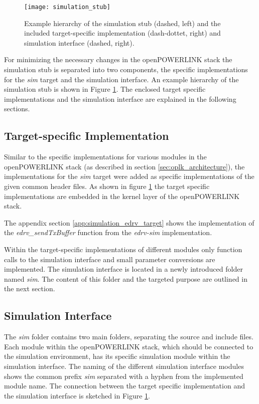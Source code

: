 \begin{figure}
    \centering
    \texttt{[image: simulation\_stub]}
    \caption{Example hierarchy of the simulation stub (dashed, left) and the included target-specific implementation (dash-dottet, right) and simulation interface (dashed, right).}
    \label{fig:simulation_stub}
\end{figure}

For minimizing the necessary changes in the openPOWERLINK stack the simulation stub is separated into two components, the specific implementations for the \emph{sim} target and the simulation interface.
An example hierarchy of the simulation stub is shown in Figure \ref{fig:simulation_stub}.
The enclosed target specific implementations and the simulation interface are explained in the following sections.

\subsection{Target-specific Implementation}
\label{sec:porting_simstub_target}
\begin{sloppypar}
Similar to the specific implementations for various modules in the openPOWERLINK stack (as described in section \ref{sec:oplk_architecture}), the implementations for the \emph{sim} target were added as specific implementations of the given common header files.
As shown in figure \ref{fig:simulation_stub} the target specific implementations are embedded in the kernel layer of the openPOWERLINK stack.
\end{sloppypar}

\begin{sloppypar}
The appendix section \ref{app:simulation_edrv_target} shows the implementation of the \emph{edrv\_sendTxBuffer} function from the \emph{edrv-sim} implementation.
\end{sloppypar}

Within the target-specific implementations of different modules only function calls to the simulation interface and small parameter conversions are implemented.
The simulation interface is located in a newly introduced folder named \emph{sim}.
The content of this folder and the targeted purpose are outlined in the next section.

\subsection{Simulation Interface}
\label{sec:porting_simstub_siminterface}
The \emph{sim} folder contains two main folders, separating the source and include files.
Each module within the openPOWERLINK stack, which should be connected to the simulation environment, has its specific simulation module within the simulation interface.
The naming of the different simulation interface modules shows the common prefix \emph{sim} separated with a hyphen from the implemented module name.
The connection between the target specific implementation and the simulation interface is sketched in Figure \ref{fig:simulation_stub}. 

